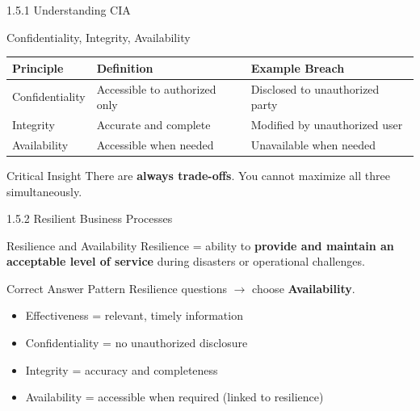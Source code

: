 \documentclass{beamer}
\begin{document}
	\begin{frame}{1.5.1 Understanding CIA}
		\begin{block}{Confidentiality, Integrity, Availability}
			\begin{tabular}{|p{2.5cm}|p{4cm}|p{4.5cm}|}
				\hline
				\textbf{Principle} & \textbf{Definition} & \textbf{Example Breach} \\
				\hline
				Confidentiality & Accessible to authorized only & Disclosed to unauthorized party \\
				\hline
				Integrity & Accurate and complete & Modified by unauthorized user \\
				\hline
				Availability & Accessible when needed & Unavailable when needed \\
				\hline
			\end{tabular}
		\end{block}
		\begin{alertblock}{Critical Insight}
			There are \textbf{always trade-offs}. You cannot maximize all three simultaneously.
		\end{alertblock}
	\end{frame}
	
	\begin{frame}{1.5.2 Resilient Business Processes}
		\begin{block}{Resilience and Availability}
			Resilience = ability to \textbf{provide and maintain an acceptable level of service} during disasters or operational challenges.
		\end{block}
		\begin{exampleblock}{Correct Answer Pattern}
			Resilience questions $\rightarrow$ choose \textbf{Availability}.
		\end{exampleblock}
		\begin{itemize}
			\item Effectiveness = relevant, timely information
			\item Confidentiality = no unauthorized disclosure
			\item Integrity = accuracy and completeness
			\item Availability = accessible when required (linked to resilience)
		\end{itemize}
	\end{frame}
	
\end{document}
